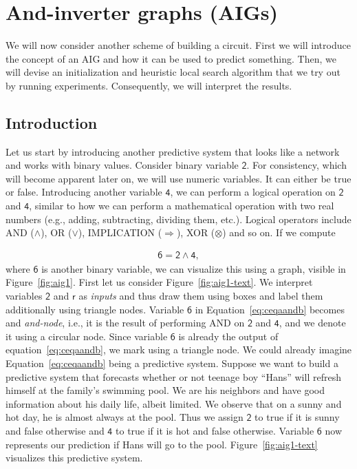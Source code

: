 \section{And-inverter graphs (AIGs)}
We will now consider another scheme of building a circuit. First we will introduce the concept of an AIG and how it can be used to predict something. Then, we will devise an initialization and heuristic local search algorithm that we try out by running experiments. Consequently, we will interpret the results.

\subsection{Introduction}
Let us start by introducing another predictive system that looks like a network and works with binary values. Consider binary variable $\mathsf{2}$. For consistency, which will become apparent later on, we will use numeric variables. It can either be true or false. Introducing another variable $\mathsf{4}$, we can perform a logical operation on $\mathsf{2}$ and $\mathsf{4}$, similar to how we can perform a mathematical operation with two real numbers (e.g., adding, subtracting, dividing them, etc.). Logical operators include AND ($\wedge$), OR ($\vee$), IMPLICATION ($\Rightarrow$), XOR ($\otimes$) and so on. If we compute

\begin{align} \label{eq:ceqaandb}
    \mathsf{6} = \mathsf{2} \wedge \mathsf{4},
  \end{align}where $\mathsf{6}$ is another binary variable, we can visualize this using a graph, visible in Figure~\ref{fig:aig1}. First let us consider Figure~\ref{fig:aig1-text}. We interpret variables $\mathsf{2}$ and $\mathsf{r}$ as \textit{inputs} and thus draw them using boxes and label them additionally using triangle nodes. Variable $\mathsf{6}$ in Equation~\ref{eq:ceqaandb} becomes and \textit{and-node}, i.e., it is the result of performing AND on $\mathsf{2}$ and $\mathsf{4}$, and we denote it using a circular node. Since variable $\mathsf{6}$ is already the output of equation~\ref{eq:ceqaandb}, we mark using a triangle node. We could already imagine Equation~\ref{eq:ceqaandb} being a predictive system. Suppose we want to build a predictive system that forecasts whether or not teenage boy \enquote{Hans} will refresh himself at the family's swimming pool. We are his neighbors and have good information about his daily life, albeit limited. We observe that on a sunny and hot day, he is almost always at the pool. Thus we assign $\mathsf{2}$ to true if it is sunny and false otherwise and $\mathsf{4}$ to true if it is hot and false otherwise. Variable $\mathsf{6}$ now represents our prediction if Hans will go to the pool. Figure~\ref{fig:aig1-text} visualizes this predictive system.

